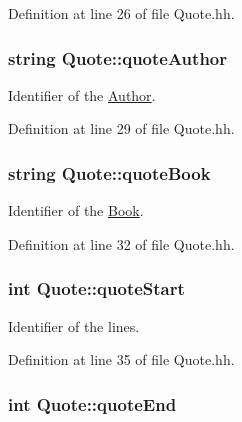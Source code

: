 Definition at line 26 of file Quote.\-hh.

\hypertarget{class_quote_a930113c4ee0ae5e5506bbc1ea3e79b49}{
\subsubsection[{quote\-Author}]{\setlength{\rightskip}{0pt plus 5cm}string Quote\-::quote\-Author\hspace{0.3cm}{\ttfamily [private]}}}\label{class_quote_a930113c4ee0ae5e5506bbc1ea3e79b49}


Identifier of the \hyperlink{class_author}{Author}. 



Definition at line 29 of file Quote.\-hh.

\hypertarget{class_quote_a7e6968e086bdd45b40627a37ecbbf6fc}{
\subsubsection[{quote\-Book}]{\setlength{\rightskip}{0pt plus 5cm}string Quote\-::quote\-Book\hspace{0.3cm}{\ttfamily [private]}}}\label{class_quote_a7e6968e086bdd45b40627a37ecbbf6fc}


Identifier of the \hyperlink{class_book}{Book}. 



Definition at line 32 of file Quote.\-hh.

\hypertarget{class_quote_ac426122ac24638740b2a5c5e8342e8c9}{
\subsubsection[{quote\-Start}]{\setlength{\rightskip}{0pt plus 5cm}int Quote\-::quote\-Start\hspace{0.3cm}{\ttfamily [private]}}}\label{class_quote_ac426122ac24638740b2a5c5e8342e8c9}


Identifier of the lines. 



Definition at line 35 of file Quote.\-hh.

\hypertarget{class_quote_aa5953a477b96183c8dc2fc8a42001c29}{
\subsubsection[{quote\-End}]{\setlength{\rightskip}{0pt plus 5cm}int Quote\-::quote\-End\hspace{0.3cm}{\ttfamily [private]}}}\label{class_quote_aa5953a477b96183c8dc2fc8a42001c29}


